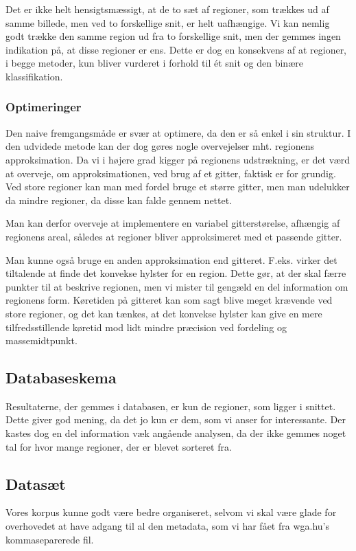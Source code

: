 {Det er ikke helt hensigtsmæssigt, at de to sæt af regioner, som trækkes
ud af samme billede, men ved to forskellige snit, er helt uafhængige. Vi
kan nemlig godt trække den samme region ud fra to forskellige snit, men
der gemmes ingen indikation på, at disse regioner er ens.  Dette er dog
en konsekvens af at regioner, i begge metoder, kun bliver vurderet i
forhold til ét snit og den binære klassifikation.

\subsubsection{Optimeringer}
Den naive fremgangsmåde er svær at optimere, da den er så enkel i sin
struktur. I den udvidede metode kan der dog gøres nogle overvejelser
mht. regionens approksimation. Da vi i højere grad kigger på
regionens udstrækning, er det værd at overveje, om approksimationen, ved
brug af et gitter, faktisk er for grundig. Ved store regioner kan man
med fordel bruge et større gitter, men man udelukker da mindre regioner,
da disse kan falde gennem nettet.

Man kan derfor overveje at implementere en variabel gitterstørelse,
afhængig af regionens areal, således at regioner bliver approksimeret med
et passende gitter.

Man kunne også bruge en anden approksimation end gitteret. F.eks. virker
det tiltalende at finde det konvekse hylster for en region. Dette
gør, at der skal færre punkter til at beskrive regionen, men vi mister
til gengæld en del information om regionens form. Køretiden på gitteret
kan som sagt blive meget krævende ved store regioner, og det kan
tænkes, at det konvekse hylster kan give en mere tilfredsstillende
køretid mod lidt mindre præcision ved fordeling og massemidtpunkt.

\subsection{Databaseskema}
Resultaterne, der gemmes i databasen, er kun de regioner, som ligger i
snittet. Dette giver god mening, da det jo 
kun er dem, som vi anser for interessante. Der kastes dog en del
information væk angående analysen, da der ikke gemmes noget tal for hvor
mange regioner, der er blevet sorteret fra.

\subsection{Datasæt}
Vores korpus kunne godt være bedre organiseret, selvom vi skal være
glade for overhovedet at have adgang til al den metadata, som vi har
fået fra wga.hu's kommaseparerede fil.

}
